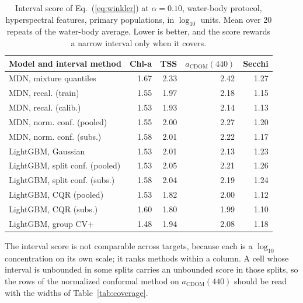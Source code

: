 \begin{table}[!tp]
\centering
\caption{Interval score of Eq.~(\ref{eq:winkler}) at $\alpha = 0.10$, water-body protocol, hyperspectral features, primary populations, in $\log_{10}$ units. Mean over 20 repeats of the water-body average. Lower is better, and the score rewards a narrow interval only when it covers.}
\label{tab:score}
\footnotesize
\setlength{\tabcolsep}{6pt}
\begin{tabular}{@{}lrrrr@{}}
\toprule
Model and interval method & Chl-a & TSS & $a_\mathrm{CDOM}(440)$ & Secchi \\
\midrule
\quad MDN, mixture quantiles & 1.67 & 2.33 & 2.42 & 1.27 \\
\quad MDN, recal. (train) & 1.55 & 1.97 & 2.18 & 1.15 \\
\quad MDN, recal. (calib.) & 1.53 & 1.93 & 2.14 & 1.13 \\
\quad MDN, norm. conf. (pooled) & 1.55 & 2.00 & 2.27 & 1.20 \\
\quad MDN, norm. conf. (subs.) & 1.58 & 2.01 & 2.22 & 1.17 \\
\quad LightGBM, Gaussian & 1.53 & 2.01 & 2.13 & 1.23 \\
\quad LightGBM, split conf. (pooled) & 1.53 & 2.05 & 2.21 & 1.26 \\
\quad LightGBM, split conf. (subs.) & 1.58 & 2.04 & 2.19 & 1.24 \\
\quad LightGBM, CQR (pooled) & 1.53 & 1.82 & 2.00 & 1.12 \\
\quad LightGBM, CQR (subs.) & 1.60 & 1.80 & 1.99 & 1.10 \\
\quad LightGBM, group CV+ & 1.48 & 1.94 & 2.08 & 1.18 \\
\bottomrule
\end{tabular}
\par\smallskip\raggedright\footnotesize The interval score is not comparable across targets, because each is a $\log_{10}$ concentration on its own scale; it ranks methods within a column. A cell whose interval is unbounded in some splits carries an unbounded score in those splits, so the rows of the normalized conformal method on $a_\mathrm{CDOM}(440)$ should be read with the widths of Table~\ref{tab:coverage}. 
\end{table}
